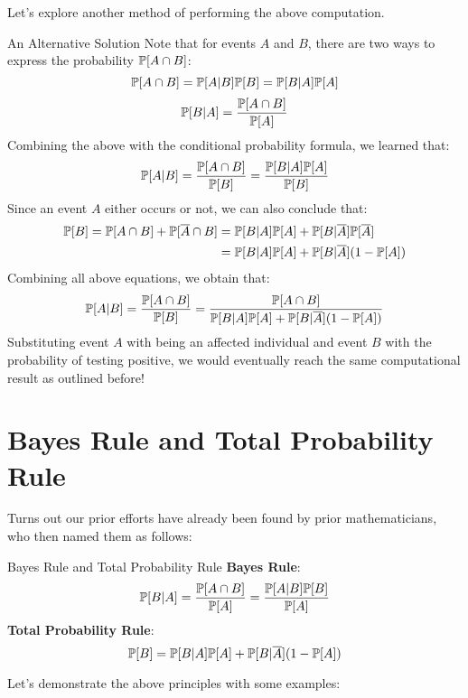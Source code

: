 Let's explore another method of performing the above computation.
\begin{ln-quest}{An Alternative Solution}{}
    Note that for events $A$ and $B$, there are two ways to express the probability $\P[A \cap B]$:
    \[\P[A \cap B] = \P[A|B] \P[B] = \P[B|A] \P[A]\]
    \[\P[B|A] = \frac{\P[A \cap B]}{\P[A]}\]
    Combining the above with the conditional probability formula, we learned that:
    \[\P[A|B] = \frac{\P[A \cap B]}{\P[B]} = \frac{\P[B|A] \P[A]}{\P[B]}\]
    Since an event $A$ either occurs or not, we can also conclude that:
    \begin{align*}
        \P[B] = \P[A \cap B] + \P[\overline{A} \cap B]
        &= \P[B|A] \P[A] + \P[B|\overline{A}] \P[\overline{A}] \\
        &= \P[B|A] \P[A] + \P[B|\overline{A}] (1 - \P[A])
    \end{align*}
    Combining all above equations, we obtain that:
    \[
        \P[A|B] = \frac{\P[A \cap B]}{\P[B]} = \frac{\P[A \cap B]}{\P[B|A] \P[A] + \P[B|\overline{A}] (1 - \P[A])}
    \]
    Substituting event $A$ with being an affected individual and event $B$ with the probability of testing positive, we would eventually reach the same computational result as outlined before!
\end{ln-quest}

\section{Bayes Rule and Total Probability Rule}
Turns out our prior efforts have already been found by prior mathematicians, who then named them as follows:
\begin{ln-define}[sidebyside]{Bayes Rule and Total Probability Rule}{}
    \textbf{Bayes Rule}:
    \[\P[B|A] = \frac{\P[A \cap B]}{\P[A]} = \frac{\P[A|B] \P[B]}{\P[A]}\]
    \tcblower
    \textbf{Total Probability Rule}:
    \[\P[B] = \P[B|A] \P[A] + \P[B|\overline{A}] (1 - \P[A])\]
\end{ln-define}
Let's demonstrate the above principles with some examples:

